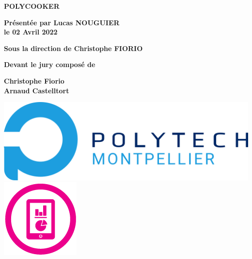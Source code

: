 \documentclass[english,12pt,a4paper]{report}
\begin{document}
\begin{titlepage}
{\bigskip

\color{Titleblue}
\fontsize{17}{20.4}\selectfont
\vspace{2cm}
\textbf{POLYCOOKER}


\vspace{4cm}
\fontsize{15}{18}\selectfont
\color{black}
\textbf{Présentée par Lucas NOUGUIER\\
le 02 Avril 2022}

\bigskip
\fontsize{13}{15.6}\selectfont
\textbf{Sous la direction de Christophe FIORIO}

\vspace{1.5cm}
\normalsize
\textbf{Devant le jury composé de}\\
\bigskip
\fontsize{10}{12}\selectfont
\vspace{1.5mm}
\begin{center}
	\textbf{Christophe Fiorio}\\
	\textbf{Arnaud Castelltort}
\end{center}

\vspace{\fill}
\begin{center}
	\includegraphics[scale=0.5]{LogoPolytech.png}
	\hspace{2cm}
	\includegraphics[scale=0.6]{LogoIG.png}
\end{center}
}
\end{titlepage}

\end{document}
